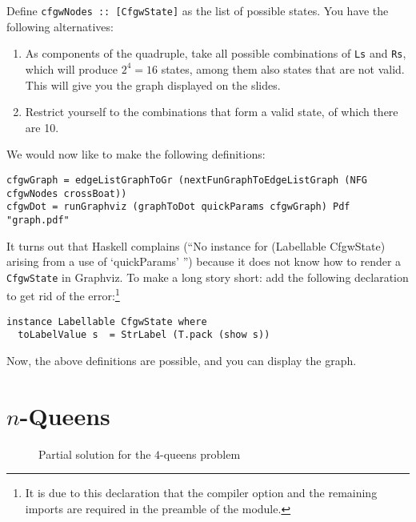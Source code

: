 \documentclass[english]{article}
\begin{document}
\begin{exo}\label{exo:cfgwDot}
  Define \texttt{cfgwNodes :: [CfgwState]} as the list of possible states. You
  have the following alternatives:
  \begin{enumerate}
  \item As components of the quadruple, take all possible combinations of
    \texttt{Ls} and \texttt{Rs}, which will produce $2^4=16$ states, among
    them also states that are not valid. This will give you the graph
    displayed on the slides.
  \item Restrict yourself to the combinations that form a valid state, of
    which there are 10.
  \end{enumerate}
\end{exo}

We would now like to make the following definitions:

\begin{lstlisting}
cfgwGraph = edgeListGraphToGr (nextFunGraphToEdgeListGraph (NFG cfgwNodes crossBoat))
cfgwDot = runGraphviz (graphToDot quickParams cfgwGraph) Pdf "graph.pdf"
\end{lstlisting}

It turns out that Haskell complains (``No instance for (Labellable CfgwState)
arising from a use of ‘quickParams’ '') because it does not know how to render
a \texttt{CfgwState} in Graphviz. To make a long story short: add the
following declaration to get rid of the error:\footnote{It is due to this
  declaration that the compiler option and the remaining imports are required
  in the preamble of the module.}
\begin{lstlisting}
instance Labellable CfgwState where
  toLabelValue s  = StrLabel (T.pack (show s))
\end{lstlisting}
Now, the above definitions are possible, and you can display the graph.

\section{$n$-Queens}\label{sec:n_queens}

\begin{figure}[t]
\begin{center}
\end{center}
\caption{Partial solution for the $4$-queens problem}\label{fig:fourqueens}
\end{figure}
\end{document}
